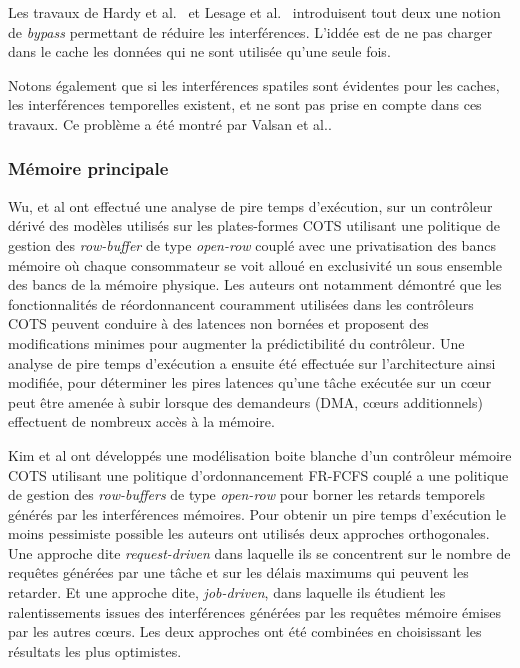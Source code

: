 Les travaux de Hardy et al.~\cite{2009_hardy_using_bypass_to_tighten_WCET_estimates_for_Multi_Core_processors_with_shared_instruction_caches} et Lesage et al.~\cite{2010_Lesage_shared_data_caches_conflicts_reduction_for_WCET_computation_in_Multi_Core_architectures} introduisent tout deux une notion de \emph{bypass} permettant de réduire les interférences.
L'iddée est de ne pas charger dans le cache les données qui ne sont utilisée qu'une seule fois.

Notons également que si les interférences spatiles sont évidentes pour les caches, les interférences temporelles existent, et ne sont pas prise en compte dans ces travaux.
Ce problème a été montré par Valsan et al.\cite{valsan2016taming}.

\subsubsection{Mémoire principale}

Wu, et al \cite{2013_Wu_Worst_case_analysis_of_DRAM_latency_in_multi_requestor_system} ont effectué une analyse de pire temps d'exécution, sur un contrôleur dérivé des modèles utilisés sur les plates-formes COTS utilisant une politique de gestion des \emph{row-buffer} de type \emph{open-row} couplé avec une privatisation des bancs mémoire où chaque consommateur se voit alloué en exclusivité un sous ensemble des bancs de la mémoire physique.
Les auteurs ont notamment démontré que les fonctionnalités de réordonnancent couramment utilisées dans les contrôleurs COTS peuvent conduire à des latences non bornées et proposent des modifications minimes pour augmenter la prédictibilité du contrôleur. Une analyse de pire temps d'exécution a ensuite été effectuée sur l'architecture ainsi modifiée, pour déterminer les pires latences qu'une tâche exécutée sur un cœur peut être amenée à subir lorsque des demandeurs (DMA, cœurs additionnels) effectuent de nombreux accès à la mémoire.

Kim et al ont \cite{2014_kim_Bounding_memory_interference_delay_in_COTS_based_multi_core_systems} développés une modélisation boite blanche d'un contrôleur mémoire COTS utilisant une politique d'ordonnancement FR-FCFS couplé a une politique de gestion des \emph{row-buffers} de type \emph{open-row} pour borner les retards temporels générés par les interférences mémoires.
Pour obtenir un pire temps d'exécution le moins pessimiste possible les auteurs ont utilisés deux approches orthogonales.
Une approche dite \emph{request-driven} dans laquelle ils se concentrent sur le nombre de requêtes générées par une tâche et sur les délais maximums qui peuvent les retarder.
Et une approche dite, \emph{job-driven}, dans laquelle ils étudient les ralentissements issues des interférences générées par les requêtes mémoire émises par les autres cœurs.
Les deux approches ont été combinées en choisissant les résultats les plus optimistes.

